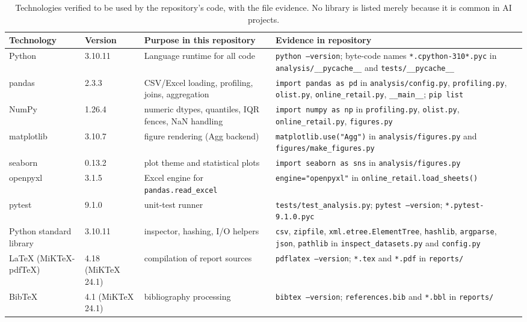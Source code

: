 \documentclass[11pt,a4paper]{article}
\newcommand{\code}[1]{\texttt{#1}}
\begin{document}
\begin{table}[H]
\centering
\small
\begin{tabularx}{\textwidth}{L{3.1cm}L{2.5cm}L{4.2cm}X}
\toprule
\textbf{Technology} & \textbf{Version} & \textbf{Purpose in this repository} & \textbf{Evidence in repository} \\
\midrule
Python & 3.10.11 & Language runtime for all code & \code{python --version}; byte-code names \code{*.cpython-310*.pyc} in \code{analysis/\_\_pycache\_\_} and \code{tests/\_\_pycache\_\_} \\
pandas & 2.3.3 & CSV/Excel loading, profiling, joins, aggregation & \code{import pandas as pd} in \code{analysis/config.py}, \code{profiling.py}, \code{olist.py}, \code{online\_retail.py}, \code{\_\_main\_\_}; \code{pip list} \\
NumPy & 1.26.4 & numeric dtypes, quantiles, IQR fences, NaN handling & \code{import numpy as np} in \code{profiling.py}, \code{olist.py}, \code{online\_retail.py}, \code{figures.py} \\
matplotlib & 3.10.7 & figure rendering (Agg backend) & \code{matplotlib.use("Agg")} in \code{analysis/figures.py} and \code{figures/make\_figures.py} \\
seaborn & 0.13.2 & plot theme and statistical plots & \code{import seaborn as sns} in \code{analysis/figures.py} \\
openpyxl & 3.1.5 & Excel engine for \code{pandas.read\_excel} & \code{engine="openpyxl"} in \code{online\_retail.load\_sheets()} \\
pytest & 9.1.0 & unit-test runner & \code{tests/test\_analysis.py}; \code{pytest --version}; \code{*.pytest-9.1.0.pyc} \\
Python standard library & 3.10.11 & inspector, hashing, I/O helpers & \code{csv}, \code{zipfile}, \code{xml.etree.ElementTree}, \code{hashlib}, \code{argparse}, \code{json}, \code{pathlib} in \code{inspect\_datasets.py} and \code{config.py} \\
\LaTeX{} (MiKTeX-pdfTeX) & 4.18 (MiKTeX 24.1) & compilation of report sources & \code{pdflatex --version}; \code{*.tex} and \code{*.pdf} in \code{reports/} \\
BibTeX & 4.1 (MiKTeX 24.1) & bibliography processing & \code{bibtex --version}; \code{references.bib} and \code{*.bbl} in \code{reports/} \\
\bottomrule
\end{tabularx}
\caption{Technologies verified to be used by the repository's code, with the file evidence. No library is listed merely because it is common in AI projects.}
\label{tab:tech}
\end{table}
\end{document}
